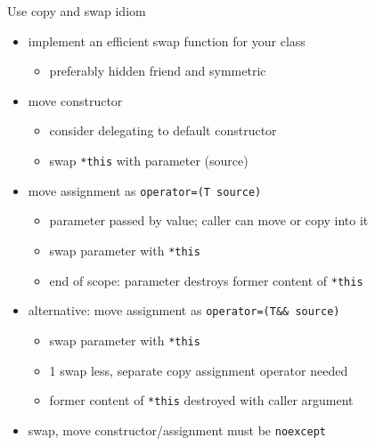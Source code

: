 \begin{frame}[fragile]
  \begin{block}{Use copy and swap idiom}
    \begin{itemize}
    \item implement an efficient swap function for your class
      \begin{itemize}
      \item preferably hidden friend and symmetric
      \end{itemize}
    \item move constructor
      \begin{itemize}
      \item consider delegating to default constructor
      \item swap \texttt{*this} with parameter (source)
      \end{itemize}
    \item move assignment as \texttt{operator=(T source)}
      \begin{itemize}
      \item parameter passed by value; caller can move or copy into it
      \item swap parameter with \texttt{*this}
      \item end of scope: parameter destroys former content of \texttt{*this}
      \end{itemize}
    \item alternative: move assignment as \texttt{operator=(T&& source)}
      \begin{itemize}
      \item swap parameter with \texttt{*this}
      \item 1 swap less, separate copy assignment operator needed
      \item former content of \texttt{*this} destroyed with caller argument
      \end{itemize}
    \item swap, move constructor/assignment must be \texttt{noexcept}
    \end{itemize}
  \end{block}
\end{frame}

